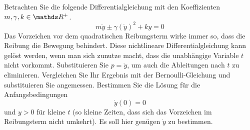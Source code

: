 \begin{atiTask}[
  title = Quadratisches Reibungsgesetz
]
  Betrachten Sie die folgende Differentialgleichung mit den Koeffizienten $m,\gamma, k\in\setR^+$.
  \[
    m\ddot{y} \pm \gamma (\dot{y})^2 + ky = 0
  \]
  Das Vorzeichen vor dem quadratischen Reibungsterm wirke immer so, dass die Reibung die Bewegung behindert.
  Diese nichtlineare Differentialgleichung kann gelöst werden, wenn man sich zunutze macht, dass die unabhängige Variable $t$ nicht vorkommt.
  Substituieren Sie $p=\dot{y}$, um auch die Ableitungen nach $t$ zu eliminieren.
  Vergleichen Sie Ihr Ergebnis mit der Bernoulli-Gleichung und substituieren Sie angemessen.
  Bestimmen Sie die Lösung für die Anfangsbedingungen
  \[
    \dot{y}(0) = 0
  \]
  und $y>0$ für kleine $t$ (so kleine Zeiten, dass sich das Vorzeichen im Reibungsterm nicht umkehrt).
  Es soll hier genügen $\dot{y}$ zu bestimmen.
\end{atiTask}